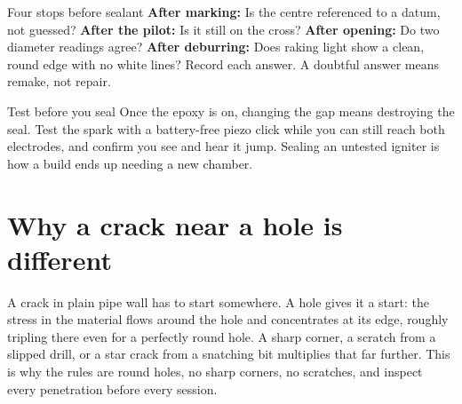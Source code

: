 \begin{center}
\end{center}

\begin{gate}{Four stops before sealant}
\textbf{After marking:} Is the centre referenced to a datum, not guessed?
\textbf{After the pilot:} Is it still on the cross?
\textbf{After opening:} Do two diameter readings agree?
\textbf{After deburring:} Does raking light show a clean, round edge with no
white lines? Record each answer. A doubtful answer means remake, not repair.
\end{gate}

\begin{gate}{Test before you seal}
Once the epoxy is on, changing the gap means destroying the seal. Test the spark
with a battery-free piezo click while you can still reach both electrodes, and
confirm you see and hear it jump. Sealing an untested igniter is how a build
ends up needing a new chamber.
\end{gate}

\section{Why a crack near a hole is different}
A crack in plain pipe wall has to start somewhere. A hole gives it a start: the
stress in the material flows around the hole and concentrates at its edge,
roughly tripling there even for a perfectly round hole. A sharp corner, a
scratch from a slipped drill, or a star crack from a snatching bit multiplies
that far further. This is why the rules are round holes, no sharp corners, no
scratches, and inspect every penetration before every session.

